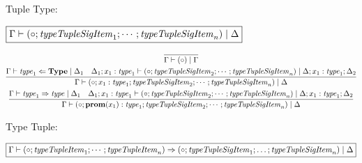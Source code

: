 Tuple Type:

$\fbox{$\Gamma \vdash (\circ; \mathit{typeTupleSigItem}_1; \cdots; \mathit{typeTupleSigItem}_n) \mid \Delta$}$

\begin{gather*}
  \infer{\Gamma \vdash (\circ) \mid \Gamma}{}
  \\
  \infer{\Gamma \vdash (\circ; x_1: \mathit{type}_1; \mathit{typeTupleSigItem}_2; \cdots; \mathit{typeTupleSigItem}_n) \mid \Delta}{
    \Gamma \vdash \mathit{type}_1 \Leftarrow \mathbf{Type} \mid \Delta_1
    &
    \Delta_1; x_1: \mathit{type}_1 \vdash (\circ; \mathit{typeTupleSigItem}_2; \cdots; \mathit{typeTupleSigItem}_n) \mid \Delta; x_1: \mathit{type}_1; \Delta_2
  }
  \\
  \infer{\Gamma \vdash (\circ; \mathbf{prom}(x_1): \mathit{type}_1; \mathit{typeTupleSigItem}_2; \cdots; \mathit{typeTupleSigItem}_n) \mid \Delta}{
    \Gamma \vdash \mathit{type}_1 \Rightarrow \mathit{type} \mid \Delta_1
    &
    \Delta_1; x_1: \mathit{type}_1 \vdash (\circ; \mathit{typeTupleSigItem}_2; \cdots; \mathit{typeTupleSigItem}_n) \mid \Delta; x_1: \mathit{type}_1; \Delta_2
  }
\end{gather*}

Type Tuple:

$\fbox{$\Gamma \vdash (\circ; \mathit{typeTupleItem}_1; \cdots; \mathit{typeTupleItem}_n) \Rightarrow (\circ; \mathit{typeTupleSigItem}_1; \ldots; \mathit{typeTupleSigItem}_n) \mid \Delta$}$

